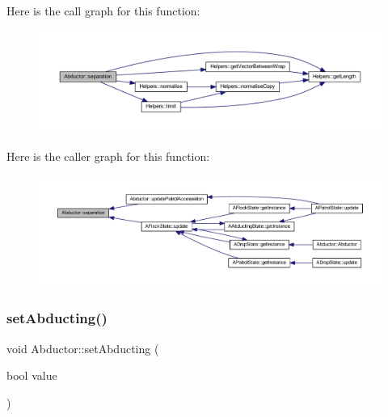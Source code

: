 Here is the call graph for this function\+:
\nopagebreak
\begin{figure}[H]
\begin{center}
\leavevmode
\includegraphics[width=350pt]{class_abductor_aac2bef46d63d3aa630a34ee1cb23a7f6_cgraph}
\end{center}
\end{figure}
Here is the caller graph for this function\+:
\nopagebreak
\begin{figure}[H]
\begin{center}
\leavevmode
\includegraphics[width=350pt]{class_abductor_aac2bef46d63d3aa630a34ee1cb23a7f6_icgraph}
\end{center}
\end{figure}
\mbox{\label{class_abductor_a1069f5de8e0696be938a741f4b931855}} 
\subsubsection{\texorpdfstring{set\+Abducting()}{setAbducting()}}
{\footnotesize\ttfamily void Abductor\+::set\+Abducting (\begin{DoxyParamCaption}\item[{bool}]{value }\end{DoxyParamCaption})}

\mbox{\label{class_abductor_a20e45bb3b4a18f7d5baeb697d1e5b1d5}} 
